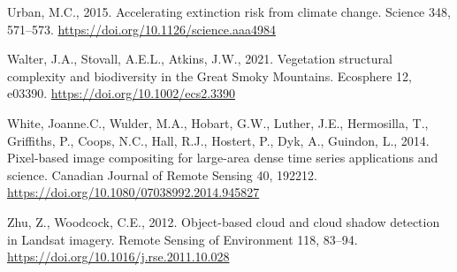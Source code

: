 \documentclass[
]{agujournal2019}
\newlength{\cslhangindent}
\newenvironment{CSLReferences}[2] %
 {\begin{list}{}{%
  \setlength{\itemindent}{0pt}
  \setlength{\leftmargin}{0pt}
  \setlength{\parsep}{0pt}
  \ifodd #1
   \setlength{\leftmargin}{\cslhangindent}
   \setlength{\itemindent}{-1\cslhangindent}
  \fi
  \setlength{\itemsep}{#2\baselineskip}}}
 {\end{list}}
\begin{document}
\begin{CSLReferences}{1}{0}
Urban, M.C., 2015. Accelerating extinction risk from climate change.
Science 348, 571--573. \url{https://doi.org/10.1126/science.aaa4984}

Walter, J.A., Stovall, A.E.L., Atkins, J.W., 2021. Vegetation structural
complexity and biodiversity in the Great Smoky Mountains. Ecosphere 12,
e03390. \url{https://doi.org/10.1002/ecs2.3390}

White, Joanne.C., Wulder, M.A., Hobart, G.W., Luther, J.E., Hermosilla,
T., Griffiths, P., Coops, N.C., Hall, R.J., Hostert, P., Dyk, A.,
Guindon, L., 2014. Pixel-based image compositing for large-area dense
time series applications and science. Canadian Journal of Remote Sensing
40, 192212. \url{https://doi.org/10.1080/07038992.2014.945827}

Zhu, Z., Woodcock, C.E., 2012. Object-based cloud and cloud shadow
detection in Landsat imagery. Remote Sensing of Environment 118, 83--94.
\url{https://doi.org/10.1016/j.rse.2011.10.028}

\end{CSLReferences}
\end{document}
